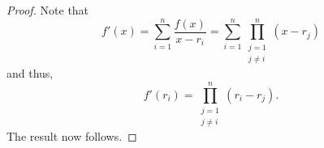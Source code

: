 \discderivative*\label{prop:discderivative2}
\begin{flushright}\hyperref[prop:discderivative]{\upsym}\end{flushright}
\begin{proof}
    Note that
    \begin{equation*}
        f'(x) = \sum_{i = 1}^{n}\frac{f(x)}{x - r_i} = \sum_{i = 1}^{n}\prod_{\substack{j = 1 \\ j \neq i}}^{n}(x- r_j)
    \end{equation*}
    and thus,
    \begin{equation*} 
        f'(r_i) = \prod_{\substack{j = 1 \\ j \neq i}}^{n}(r_i - r_j).
    \end{equation*}
    The result now follows.
\end{proof}

